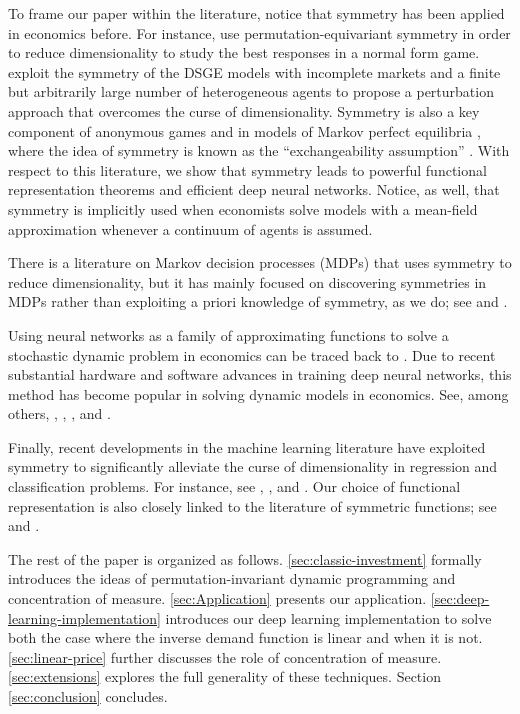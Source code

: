 \documentclass[12pt]{article}
\begin{document}
To frame our paper within the literature, notice that symmetry has been applied in economics before. For instance, \citet{hartford2016deep} use permutation-equivariant symmetry in order to reduce dimensionality to study the best responses in a normal form game. \citet{Mertens2018} exploit the symmetry of the DSGE models with incomplete markets and a finite but arbitrarily large number of heterogeneous agents to propose a perturbation approach that overcomes the curse of dimensionality.  Symmetry is also a key component of anonymous games \citep{Jovanovic1988} and in models of Markov perfect equilibria \citep{Pakes2001}, where the idea of symmetry is known as the ``exchangeability assumption'' \citep{aguirregabiria2013}. With respect to this literature, we show that symmetry leads to powerful functional representation theorems and efficient deep neural networks. Notice, as well, that symmetry is implicitly used when economists solve models with a mean-field approximation whenever a continuum of agents is assumed. 

There is a literature on Markov decision processes (MDPs) that uses symmetry to reduce dimensionality, but it has mainly focused on discovering symmetries in MDPs rather than exploiting a priori knowledge of symmetry, as we do; see \citet{ravindran2001symmetries} and \citet{narayanamurthy2008hardness}. 

Using neural networks as a family of approximating functions to solve a stochastic dynamic problem in economics can be traced back to \citet{duffy1997approximating}. Due to recent substantial hardware and software advances in training deep neural networks, this method has become popular in solving dynamic models in economics. See, among others, \citet{MaliarMaliarWinant2019}, \citet{fernandez2019financial}, \citet{duarte2018machine}, and \citet{azinovic2019deep}.

Finally, recent developments in the machine learning literature have exploited symmetry to significantly alleviate the curse of dimensionality in regression and classification problems. For instance, see \citet{Bloem2020}, \citet{zaheer2017deep}, and \citet{yarotsky2018universal}. Our choice of functional representation is also closely linked to the literature of symmetric functions; see \citet{prasad2018introduction} and \citet{zabrocki2015introduction}.
	
The rest of the paper is organized as follows. \cref{sec:classic-investment} formally introduces the ideas of permutation-invariant dynamic programming and concentration of measure. \cref{sec:Application} presents our application. \cref{sec:deep-learning-implementation} introduces our deep learning implementation to solve both the case where the inverse demand function is linear and when it is not. \cref{sec:linear-price} further discusses the role of concentration of measure. \cref{sec:extensions} explores the full generality of these techniques. Section \cref{sec:conclusion} concludes.
\end{document}
